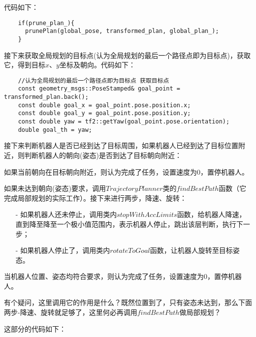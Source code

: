 \documentclass[9pt, oneside]{book}
\begin{document}
代码如下：

\small
\begin{verbatim}
    if(prune_plan_){
      prunePlan(global_pose, transformed_plan, global_plan_);
    }
\end{verbatim}
\normalsize

接下来获取全局规划的目标点(认为全局规划的最后一个路径点即为目标点)，获取它，得到目标$x$、$y$坐标及朝向。代码如下：

\small
\begin{verbatim}
    //认为全局规划的最后一个路径点即为目标点 获取目标点
    const geometry_msgs::PoseStamped& goal_point = transformed_plan.back();
    const double goal_x = goal_point.pose.position.x;
    const double goal_y = goal_point.pose.position.y;
    const double yaw = tf2::getYaw(goal_point.pose.orientation);
    double goal_th = yaw;
\end{verbatim}
\normalsize

接下来判断机器人是否已经到达了目标周围，如果机器人已经到达了目标位置附近，则判断机器人的朝向(姿态)是否到达了目标朝向附近：

如果当前朝向在目标朝向附近，则认为完成了任务，设置速度为0，置停机器人。

如果未达到朝向(姿态)要求，调用$TrajectoryPlanner$类的$findBestPath$函数（它完成局部规划的实际工作）。接下来进行两步，降速、旋转：

\begin{itemize}
    \item [-] 如果机器人还未停止，调用类内$stopWithAccLimits$函数，给机器人降速，直到降至降至一个极小值范围内，表示机器人停止，跳出该层判断，执行下一步；
    \item [-] 如果机器人停止了，调用类内$rotateToGoal$函数，让机器人旋转至目标姿态。
\end{itemize}

当机器人位置、姿态均符合要求，则认为完成了任务，设置速度为0，置停机器人。

\textcolor[rgb]{1,0,0}{有个疑问，这里调用它的作用是什么？既然位置到了，只有姿态未达到，那么下面两步-降速、旋转就足够了，这里何必再调用$findBestPath$做局部规划？}

这部分的代码如下：
\end{document}
